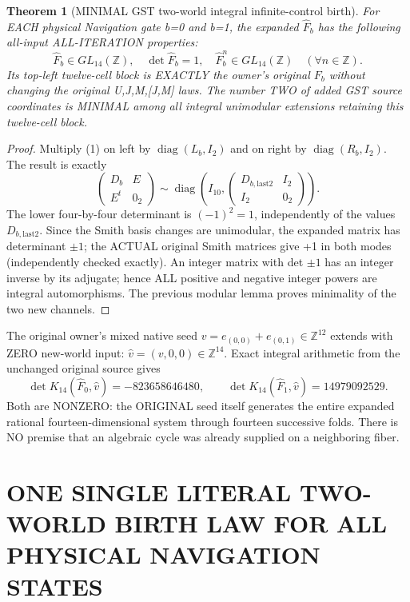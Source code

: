 \documentclass[11pt]{article}
\newtheorem{theorem}{Theorem}
\begin{document}
\begin{theorem}[MINIMAL GST two-world integral infinite-control birth]
For EACH physical Navigation gate b=0 and b=1,
the expanded \(\widehat F_b\) has the following
all-input ALL-ITERATION properties:
\[
\boxed{
\widehat F_b\in GL_{14}(\mathbb Z),
\quad \det\widehat F_b=1,\quad
\widehat F_b^n\in GL_{14}(\mathbb Z)
\quad(\forall n\in\mathbb Z).
}
\]
Its top-left twelve-cell block is EXACTLY
the owner's original \(F_b\) without changing
the original U,J,M,[J,M] laws.
The number TWO of added GST source
coordinates is MINIMAL among all
integral unimodular extensions retaining
this twelve-cell block.
\end{theorem}
\begin{proof}
Multiply (1) on left by
\(\operatorname{diag}(L_b,I_2)\) and
on right by \(\operatorname{diag}(R_b,I_2)\).
The result is exactly
\[
\begin{pmatrix}
D_b&E\\E^t&0_2
\end{pmatrix}
\sim
\operatorname{diag}
\left(I_{10},
\begin{pmatrix}D_{b,\mathrm{last2}}&I_2\\I_2&0_2\end{pmatrix}\right).
\]
The lower four-by-four determinant is
\((-1)^2=1\), independently of the
values \(D_{b,\mathrm{last2}}\). Since the
Smith basis changes are unimodular,
the expanded matrix has determinant \(\pm1\);
the ACTUAL original Smith matrices give +1
in both modes (independently checked exactly).
An integer matrix with det \(\pm1\)
has an integer inverse by its adjugate;
hence ALL positive and negative
integer powers are integral automorphisms.
The previous modular lemma proves
minimality of the two new channels.
\end{proof}

The original owner's mixed native seed
\(v=e_{(0,0)}+e_{(0,1)}\in\mathbb Z^{12}\)
extends with ZERO new-world input:
\(\hat v=(v,0,0)\in\mathbb Z^{14}\).
Exact integral arithmetic from the
unchanged original source gives
\[
\boxed{
\det K_{14}(\widehat F_0,\hat v)
=-823658646480,\qquad
\det K_{14}(\widehat F_1,\hat v)
=14979092529.}
\]
Both are NONZERO: the ORIGINAL seed
itself generates the entire expanded
rational fourteen-dimensional system
through fourteen successive folds.
There is NO premise that an algebraic
cycle was already supplied on a
neighboring fiber.


\section{ONE SINGLE LITERAL TWO-WORLD BIRTH LAW FOR ALL PHYSICAL NAVIGATION STATES}
\end{document}
